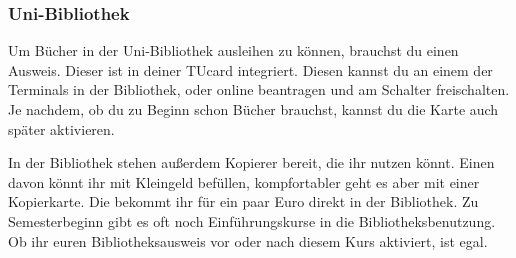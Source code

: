 \begin{multicols}{2}
\subsubsection{Uni-Bibliothek}
	\label{todobib}

	Um Bücher in der Uni-Bibliothek ausleihen zu können, brauchst du einen Ausweis. Dieser ist in deiner TUcard integriert. Diesen kannst du an einem der Terminals in der Bibliothek, oder online beantragen und am Schalter freischalten. Je nachdem, ob du zu Beginn schon Bücher brauchst, kannst du die Karte auch später aktivieren.

	In der Bibliothek stehen außerdem Kopierer bereit, die ihr nutzen könnt. Einen davon könnt ihr mit Kleingeld befüllen, kompfortabler geht es aber mit einer Kopierkarte. Die bekommt ihr für ein paar Euro direkt in der Bibliothek. Zu Semesterbeginn gibt es oft noch Einführungskurse in die Bibliotheksbenutzung. Ob ihr euren Bibliotheksausweis vor oder nach diesem Kurs aktiviert, ist egal.
	
\end{multicols}
